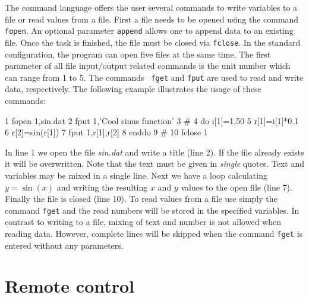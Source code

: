 The command language offers the user several commands to write
variables to a file or read values from a file. First a file needs
to be opened using the command {\tt fopen}. An optional parameter
{\tt append} allows one to append data to an existing file. Once the
task is finished, the file must be closed via {\tt fclose}. In the
standard configuration, the program can open five files at the same
time. The first parameter of all file input/output related commands
is the unit number which can range from 1 to 5. The commands {\tt
fget} and {\tt fput} are used to read and write data, respectively.
The following example illustrates the usage of these commands:

\footnotesize
\begin{MacVerbatim}
      1  fopen 1,sin.dat
      2  fput 1,'Cool sinus function'
      3  #
      4  do i[1]=1,50
      5     r[1]=i[1]*0.1
      6     r[2]=sin(r[1])
      7     fput 1,r[1],r[2]
      8  enddo
      9  #
     10  fclose 1
\end{MacVerbatim}
\normalsize

In line 1 we open the file {\it sin.dat} and write a title (line 2).
If the file already exists it will be overwritten. Note that the
text must be given in {\it single} quotes. Text and variables may be
mixed in a single line. Next we have a loop calculating $y=\sin(x)$
and writing the resulting $x$ and $y$ values to the open file (line
7). Finally the file is closed (line 10). To read values from a file
use simply the command {\tt fget} and the read numbers will be
stored in the specified variables. In contrast to writing to a file,
mixing of text and number is not allowed when reading data. However,
complete lines will be skipped when the command {\tt fget} is
entered without any parameters.


\section{Remote control\label{remote}}

